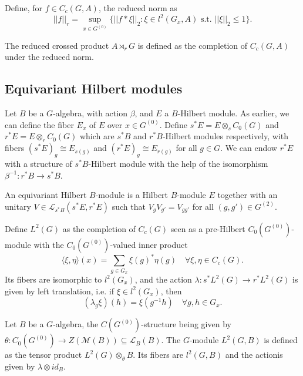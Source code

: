 Define, for $f\in C_c(G,A)$, the reduced norm as 
\[||f||_r= \sup_{x\in G^{(0)}}\{ ||f\ast \xi||_2 : \xi\in l^2(G_x,A) \text{ s.t. } ||\xi||_2\leq 1\}.\]


\begin{definition}
The reduced crossed product $A\rtimes_r G$ is defined as the completion of $C_c(G,A)$ under the reduced norm.
\end{definition}


\subsection{Equivariant Hilbert modules}
Let $B$ be a $G$-algebra, with action $\beta$, and $E$ a $B$-Hilbert module. As earlier, we can define the fiber $E_x$ of $E$ over $x\in G^{(0)}$. Define $s^* E = E \otimes_s C_0(G)$ and $r^* E = E \otimes_r C_0(G)$ which are $s^*B$ and $r^*B$-Hilbert modules respectively, with fibers $(s^* E)_g \cong E_{s(g)}$ and $(r^* E)_g \cong E_{r(g)}$ for all $g\in G$. We can endow $r^*E$ with a structure of $s^* B$-Hilbert module with the help of the isomorphism $\beta^{-1} : r^* B\rightarrow s^* B$.

\begin{definition}
An equivariant Hilbert $B$-module is a Hilbert $B$-module $E$ together with an unitary $V\in\mathcal L_{s^* B}(s^*E ,r^* E)$ such that $V_gV_{g'} = V_{gg'}$ for all $(g,g')\in G^{(2)}$.
\end{definition}

\begin{Expl} Define $L^2(G)$ as the completion of $C_c(G)$ seen as a pre-Hilbert $C_0(G^{(0)})$-module with the $C_0(G^{(0)})$-valued inner product 
\[\langle \xi ,\eta\rangle (x) = \sum_{g\in G_x} \xi(g)^*\eta(g) \quad \forall \xi,\eta\in C_c(G).\]
Its fibers are isomorphic to $l^2(G_x)$, and the action $\lambda : s^*L^2(G) \rightarrow r^* L^2(G)$ is given by left translation, i.e. if $\xi\in l^2(G_x)$, then
\[(\lambda_g\xi)(h) = \xi(g^{-1}h)\quad \forall g,h\in G_x.\]
\end{Expl}

\begin{Expl} Let $B$ be a $G$-algebra, the $C(G^{(0)})$-structure being given by $\theta : C_0(G^{(0)})\rightarrow Z(\mathcal M(B))\subseteq \mathcal L_B(B)$. The $G$-module $L^2(G,B)$ is defined as the tensor product $ L^2(G)\otimes_\theta B$. Its fibers are $l^2(G,B)$ and the actionis given by $\lambda\otimes id_{B}$.
\end{Expl}

